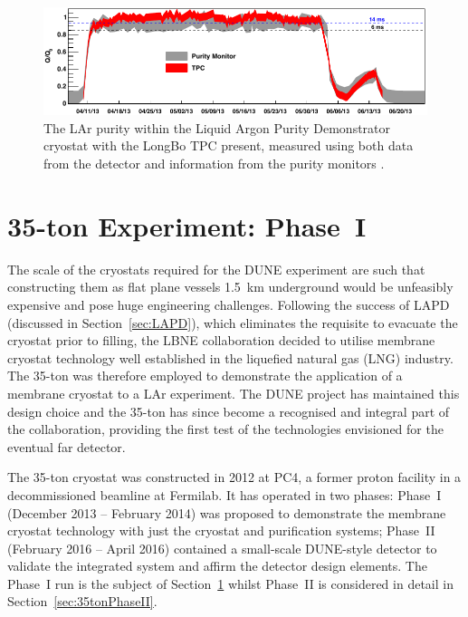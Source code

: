 \begin{figure}
  \centering
  \includegraphics[width=14cm]{LongBoPurity.pdf}
  \caption[The LAr purity within the Liquid Argon Purity Demonstrator cryostat with the LongBo TPC present, measured using both data from the detector and information from the purity monitors.]{The LAr purity within the Liquid Argon Purity Demonstrator cryostat with the LongBo TPC present, measured using both data from the detector and information from the purity monitors \cite{LongBo2015}.}
  \label{fig:LongBoPurity}
\end{figure}

\section{35-ton Experiment: Phase~I}\label{sec:35tonPhaseI}

The scale of the cryostats required for the DUNE experiment are such that constructing them as flat plane vessels 1.5~km underground would be unfeasibly expensive and pose huge engineering challenges.  Following the success of LAPD (discussed in Section~\ref{sec:LAPD}), which eliminates the requisite to evacuate the cryostat prior to filling, the LBNE collaboration decided to utilise membrane cryostat technology well established in the liquefied natural gas (LNG) industry.  The 35-ton \cite{35tonPhaseI2014,35tonPhaseI2014Cryostat,35tonPhaseI2015} was therefore employed to demonstrate the application of a membrane cryostat to a LAr experiment.  The DUNE project has maintained this design choice and the 35-ton has since become a recognised and integral part of the collaboration, providing the first test of the technologies envisioned for the eventual far detector.

The 35-ton cryostat was constructed in 2012 at PC4, a former proton facility in a decommissioned beamline at Fermilab.  It has operated in two phases: Phase~I (December 2013 -- February 2014) was proposed to demonstrate the membrane cryostat technology with just the cryostat and purification systems; Phase~II (February 2016 -- April 2016) contained a small-scale DUNE-style detector to validate the integrated system and affirm the detector design elements.  The Phase~I run is the subject of Section~\ref{sec:35tonPhaseI} whilst Phase~II is considered in detail in Section~\ref{sec:35tonPhaseII}.

